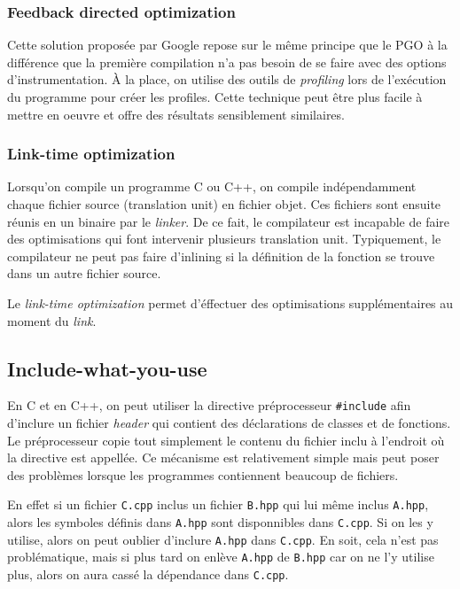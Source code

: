 \documentclass[a4paper]{report}
\begin{document}
            \subsubsection{Feedback directed optimization}
                Cette solution proposée par Google repose sur le même principe que le PGO à la différence que la première compilation n'a pas besoin de se faire avec des options d'instrumentation.
                À la place, on utilise des outils de \emph{profiling} lors de l'exécution du programme pour créer les profiles.
                Cette technique peut être plus facile à mettre en oeuvre et offre des résultats sensiblement similaires.

            \subsubsection{Link-time optimization}
                Lorsqu'on compile un programme C ou C++, on compile indépendamment chaque fichier source (translation unit) en fichier objet.
                Ces fichiers sont ensuite réunis en un binaire par le \emph{linker}.
                De ce fait, le compilateur est incapable de faire des optimisations qui font intervenir plusieurs translation unit.
                Typiquement, le compilateur ne peut pas faire d'inlining si la définition de la fonction se trouve dans un autre fichier source.

                Le \emph{link-time optimization} permet d'éffectuer des optimisations supplémentaires au moment du \emph{link}.

        \subsection{Include-what-you-use}
            En C et en C++, on peut utiliser la directive préprocesseur \verb'#include' afin d'inclure un fichier \emph{header} qui contient des déclarations de classes et de fonctions.
            Le préprocesseur copie tout simplement le contenu du fichier inclu à l'endroit où la directive est appellée.
            Ce mécanisme est relativement simple mais peut poser des problèmes lorsque les programmes contiennent beaucoup de fichiers.

            En effet si un fichier \verb'C.cpp' inclus un fichier \verb'B.hpp' qui lui même inclus \verb'A.hpp', alors les symboles définis dans \verb'A.hpp' sont disponnibles dans \verb'C.cpp'.
            Si on les y utilise, alors on peut oublier d'inclure \verb'A.hpp' dans \verb'C.cpp'.
            En soit, cela n'est pas problématique, mais si plus tard on enlève \verb'A.hpp' de \verb'B.hpp' car on ne l'y utilise plus, alors on aura cassé la dépendance dans \verb'C.cpp'.
\end{document}
